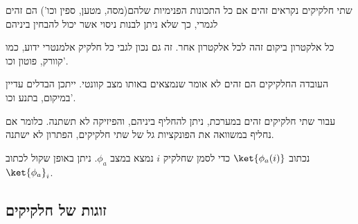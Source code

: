 \documentclass{tstextbook}
\begin{document}
\begin{definition}
שתי חלקיקים נקראים זהים אם כל התכונות הפנימיות שלהם(מסה, מטען, ספין וכו') הם זהים לגמרי, כך שלא ניתן לבנות ניסוי אשר יכול להבחין ביניהם

\end{definition}
\begin{example}
כל אלקטרון ביקום זהה לכל אלקטרון אחר. זה גם נכון לגבי כל חלקיק אלמנטרי ידוע, כמו קוורק, פוטון וכו'.

\end{example}
\begin{remark}
העובדה החלקיקים הם זהים לא אומר שנמצאים באותו מצב קוונטי. ייתכן הבדלים עדיין במיקום, בתנע וכו'.

\end{remark}
\begin{proposition}
עבור שתי חלקיקים זהים במערכת, ניתן להחליף ביניהם, והפיזיקה לא תשתנה. כלומר אם נחליף במשוואה את הפונקציות גל של שתי חלקיקים, הפתרון לא ישתנה.

\end{proposition}
\begin{symbolize}
נכתוב \(\ket{\phi_{a}(i)}\) כדי לסמן שחלקיק \(i\) נמצא במצב \(\phi_{a}\). ניתן באופן שקול לכתוב \(\ket{\phi_{a}}_{i}\).

\end{symbolize}
\subsection{זוגות של חלקיקים}
\end{document}
